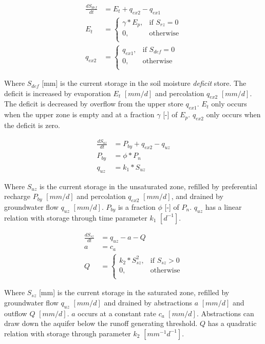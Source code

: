 \begin{align}
	\frac{dS_{def}}{dt} &= E_t + q_{ex2} - q_{ex1}\\
	E_t &=\begin{cases}
		\gamma*E_p, &\text{if } S_{rz} = 0 \\
		0, & \text{otherwise} \\
	\end{cases} \\
	 q_{ex2}  &= \begin{cases}
		q_{ex1}, &\text{if } S_{def} = 0 \\
		0, & \text{otherwise} \\
	\end{cases}
\end{align}

Where $S_{def}$ [mm] is the current storage in the soil moisture \emph{deficit} store.
The deficit is increased by evaporation $E_t$ $[mm/d]$ and percolation $q_{ex2}$ $[mm/d]$.
The deficit is decreased by overflow from the upper store $q_{ex1}$.
$E_t$ only occurs when the upper zone is empty and at a fraction $\gamma$ [-] of $E_p$.
$q_{ex2}$ only occurs when the deficit is zero.

\begin{align}
	\frac{dS_{uz}}{dt} &= P_{by} + q_{ex2} - q_{uz} \\
	P_{by} &= \phi*P_n\\
	q_{uz} &= k_1*S_{uz}
\end{align}
  
Where $S_{uz}$ is the current storage in the unsaturated zone, refilled by preferential recharge $P_{by}$ $[mm/d]$ and percolation $q_{ex2}$ $[mm/d]$, and drained by groundwater flow $q_{uz}$ $[mm/d]$.
$P_{by}$ is a fraction $\phi$ [-] of $P_n$.
$q_{uz}$ has a linear relation with storage through time parameter $k_1$ $[d^{-1}]$.

\begin{align}
	\frac{dS_{sz}}{dt} &= q_{uz} -a-Q\\
	a &= c_a\\
	Q &= \begin{cases}
		k_2*S_{sz}^2, &\text{if } S_{sz} > 0 \\
		0, & \text{otherwise} \\
	\end{cases}
\end{align}

Where $S_{sz}$ [mm] is the current storage in the saturated zone, refilled by groundwater flow $q_{uz}$ $[mm/d]$ and drained by abstractions $a$ $[mm/d]$ and outflow $Q$ $[mm/d]$.
$a$ occurs at a constant rate $c_a$ $[mm/d]$.
Abstractions can draw down the aquifer below the runoff generating threshold. 
$Q$ has a quadratic relation with storage through parameter $k_2$ $[mm^{-1} d^{-1}]$.

